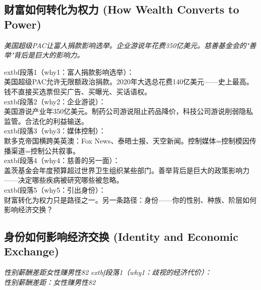 \documentclass[a4paper,12pt]{book}
\newenvironment{motivation}{\begin{tcolorbox}[colback=gray!10,colframe=gray!60,title=\textit{动机}]\small\itshape}{\end{tcolorbox}}
\begin{document}
\begin{motivation}
\begin{motivation}
	\subsection{财富如何转化为权力 (How Wealth Converts to Power)}
	\begin{motivation}美国超级PAC让富人捐款影响选举。企业游说年花费350亿美元。慈善基金会的"善举"背后是巨大的影响力。\end{motivation}
		extbf{段落1（why1：富人捐款影响选举）}：\\美国超级PAC允许无限额政治捐款。2020年大选总花费140亿美元——史上最高。钱不直接买选票但买广告、买曝光、买话语权。\\	extbf{段落2（why2：企业游说）}：\\美国游说产业年350亿美元。制药公司游说阻止药品降价，科技公司游说削弱隐私监管。合法化的利益输送。\\	extbf{段落3（why3：媒体控制）}：\\默多克帝国横跨美英澳：Fox News、泰晤士报、天空新闻。控制媒体=控制模因传播渠道=控制公共叙事。\\	extbf{段落4（why4：慈善的另一面）}：\\盖茨基金会年度预算超过世界卫生组织某些部门。善举背后是巨大的政策影响力——决定哪些疾病被研究哪些被忽略。\\	extbf{段落5（why5：引出身份）}：\\财富转化为权力只是路径之一。另一条路径：身份——你的性别、种族、阶层如何影响经济交换？

	\subsection{身份如何影响经济交换 (Identity and Economic Exchange)}
	\begin{motivation}性别薪酬差距女性赚男性82%
		extbf{段落1（why1：歧视的经济代价）}：\\性别薪酬差距：女性赚男性82%


\end{motivation}
\end{motivation}
\end{motivation}
\end{document}
